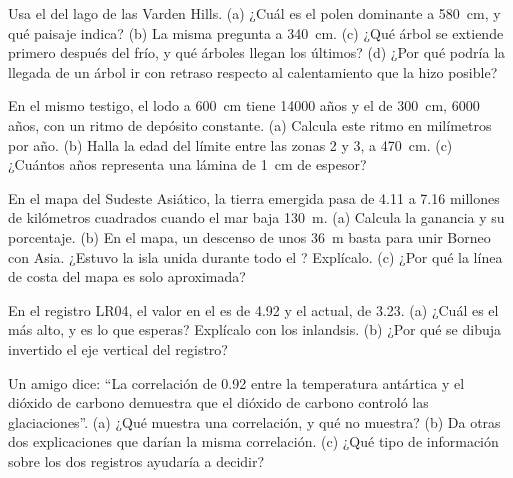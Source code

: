 \begin{exercise}[$\star\star$]\label{exo:g12:past-climates:7}
Usa el  del lago de las Varden Hills. (a) ¿Cuál es el polen
dominante a \qty{580}{cm}, y qué paisaje indica? (b) La misma
pregunta a \qty{340}{cm}. (c) ¿Qué árbol se extiende primero después del frío, y
qué árboles llegan los últimos? (d) ¿Por qué podría la llegada de un árbol ir con retraso respecto al
calentamiento que la hizo posible?
\end{exercise}

\begin{exercise}[$\star\star$]\label{exo:g12:past-climates:8}
En el mismo testigo, el lodo a \qty{600}{cm} tiene \num{14000} años y el de
\qty{300}{cm}, \num{6000} años, con un ritmo de depósito constante.
(a) Calcula este ritmo en milímetros por año. (b) Halla la edad del límite
entre las zonas 2 y 3, a \qty{470}{cm}. (c) ¿Cuántos años representa una lámina
de \qty{1}{cm} de espesor?
\end{exercise}

\begin{exercise}[$\star\star$]\label{exo:g12:past-climates:9}
En el mapa del Sudeste Asiático, la tierra emergida pasa de 4.11 a
7.16 millones de kilómetros cuadrados cuando el mar baja \qty{130}{m}.
(a) Calcula la ganancia y su porcentaje. (b) En el mapa, un descenso de unos
\qty{36}{m} basta para unir Borneo con Asia. ¿Estuvo la isla unida durante todo el ? Explícalo. (c) ¿Por qué la línea de costa del mapa es solo
aproximada?
\end{exercise}

\begin{exercise}[$\star\star$]\label{exo:g12:past-climates:10}
En el registro LR04, el valor en el  es de
\qty{4.92}{\permil} y el actual, de \qty{3.23}{\permil}. (a) ¿Cuál es el más alto,
y es lo que esperas? Explícalo con los inlandsis. (b) ¿Por qué se dibuja
invertido el eje vertical del registro?
\end{exercise}

\begin{exercise}[$\star\star$]\label{exo:g12:past-climates:11}
Un amigo dice: ``La correlación de 0.92 entre la temperatura antártica
y el dióxido de carbono demuestra que el dióxido de carbono controló las glaciaciones''.
(a) ¿Qué muestra una correlación, y qué no muestra? (b) Da otras dos
explicaciones que darían la misma correlación. (c) ¿Qué tipo de
información sobre los dos registros ayudaría a decidir?
\end{exercise}

